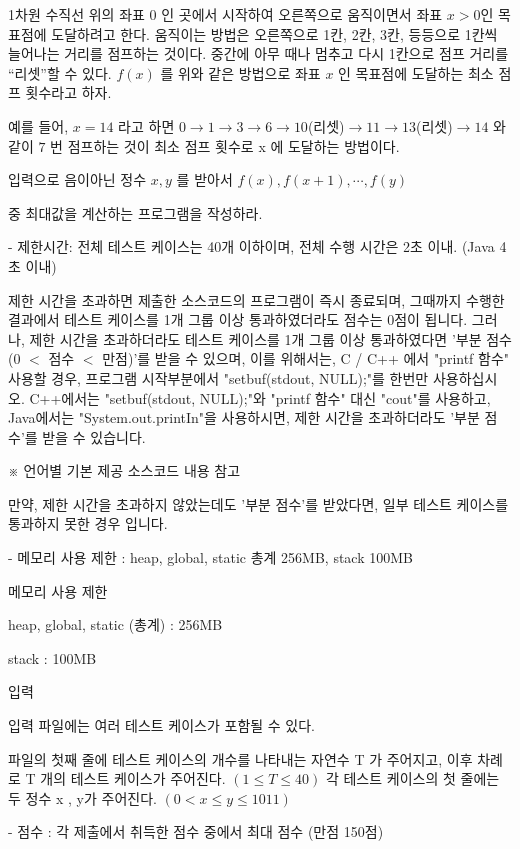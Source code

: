 \documentclass [12pt] {oblivoir}
\begin{document}
1차원 수직선 위의 좌표 0 인 곳에서 시작하여 오른쪽으로 움직이면서 좌표 $x>0$인 목표점에 도달하려고 한다.
움직이는 방법은 오른쪽으로 1칸, 2칸, 3칸, 등등으로 1칸씩 늘어나는 거리를 점프하는 것이다.
중간에 아무 때나 멈추고 다시 1칸으로 점프 거리를 “리셋”할 수 있다.
$f(x)$ 를 위와 같은 방법으로 좌표 $x$ 인 목표점에 도달하는 최소 점프 횟수라고 하자.

예를 들어, $x=14$ 라고 하면 $0 \rightarrow 1 \rightarrow 3 \rightarrow 6 \rightarrow 10$(리셋)$\rightarrow 11 \rightarrow 13$(리셋)$\rightarrow 14$ 와 같이 $7$ 번 점프하는 것이 최소 점프 횟수로 x 에 도달하는 방법이다.

입력으로 음이아닌 정수 $x, y$ 를 받아서 $f(x)  ,f(x+1) , \cdots , f(y)$

중 최대값을 계산하는 프로그램을 작성하라.

- 제한시간: 전체 테스트 케이스는 40개 이하이며, 전체 수행 시간은 2초 이내. (Java 4초 이내)

제한 시간을 초과하면 제출한 소스코드의 프로그램이 즉시 종료되며, 그때까지 수행한 결과에서 테스트 케이스를 1개 그룹 이상 통과하였더라도 점수는 0점이 됩니다.
그러나, 제한 시간을 초과하더라도 테스트 케이스를 1개 그룹 이상 통과하였다면 '부분 점수(0 $<$ 점수 $<$ 만점)'를 받을 수 있으며,
이를 위해서는, C / C++ 에서 "printf 함수" 사용할 경우, 프로그램 시작부분에서 "setbuf(stdout, NULL);"를 한번만 사용하십시오.
C++에서는 "setbuf(stdout, NULL);"와 "printf 함수" 대신 "cout"를 사용하고, Java에서는 "System.out.printIn"을 사용하시면,
제한 시간을 초과하더라도 '부분 점수'를 받을 수 있습니다.

※ 언어별 기본 제공 소스코드 내용 참고

만약, 제한 시간을 초과하지 않았는데도 '부분 점수'를 받았다면, 일부 테스트 케이스를 통과하지 못한 경우 입니다.

- 메모리 사용 제한 : heap, global, static 총계 256MB, stack 100MB

메모리 사용 제한

heap, global, static (총계) : 256MB

stack : 100MB

입력

입력 파일에는 여러 테스트 케이스가 포함될 수 있다.

파일의 첫째 줄에 테스트 케이스의 개수를 나타내는 자연수 T
가 주어지고,
이후 차례로  T 개의 테스트 케이스가 주어진다. $( 1 \le T \le 40 )$
각 테스트 케이스의 첫 줄에는 두 정수 x , y가 주어진다. $( 0 < x \le y \le 1011 )$

- 점수 : 각 제출에서 취득한 점수 중에서 최대 점수 (만점 150점)
\end{document}
